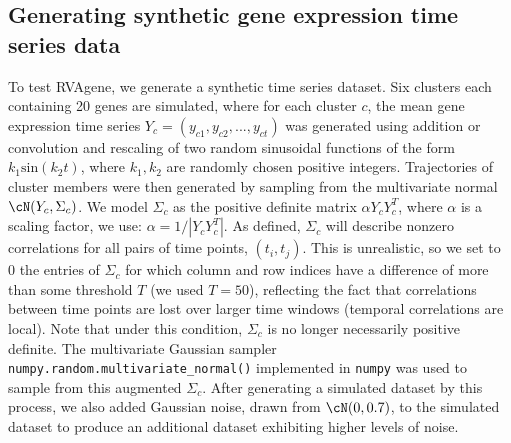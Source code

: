 \subsection{Generating synthetic gene expression time series data}
To test RVAgene, we generate a synthetic time series dataset. Six clusters each containing 20 genes are simulated, where for each cluster $c$, the mean gene expression time series $Y_c = (y_{c1}, y_{c2}, ..., y_{ct})$ was generated using addition or convolution and rescaling of two random sinusoidal functions of the form $k_1\textrm{sin}(k_2t)$, where $k_1,k_2$ are randomly chosen positive integers. Trajectories of cluster members were then generated by sampling from the multivariate normal $\cN(Y_c,\Sigma_c)$. We model $\Sigma_c$ as the positive definite matrix $\alpha Y_cY_c^T$, where $\alpha$ is a scaling factor, we use: $\alpha = 1/|Y_c Y_c^T|$. As defined, $\Sigma_c$ will describe nonzero correlations for all pairs of time points, $(t_i,t_j)$. This is unrealistic, so we set to 0 the entries of $\Sigma_c$ for which column and row indices have a difference of more than some threshold $T$ (we used $T=50$), reflecting the fact that correlations between time points are lost over larger time windows (temporal correlations are local). Note that under this condition, $\Sigma_c$  is no longer necessarily positive definite. The multivariate Gaussian sampler \verb+numpy.random.multivariate_normal()+ implemented in \verb+numpy+ \citep{harris2020array} was used to sample from this augmented $\Sigma_c$.
{After generating a simulated dataset by this process, we also added Gaussian noise, drawn from $\cN(0,0.7)$, to the simulated dataset to produce an additional dataset exhibiting higher levels of noise.}

